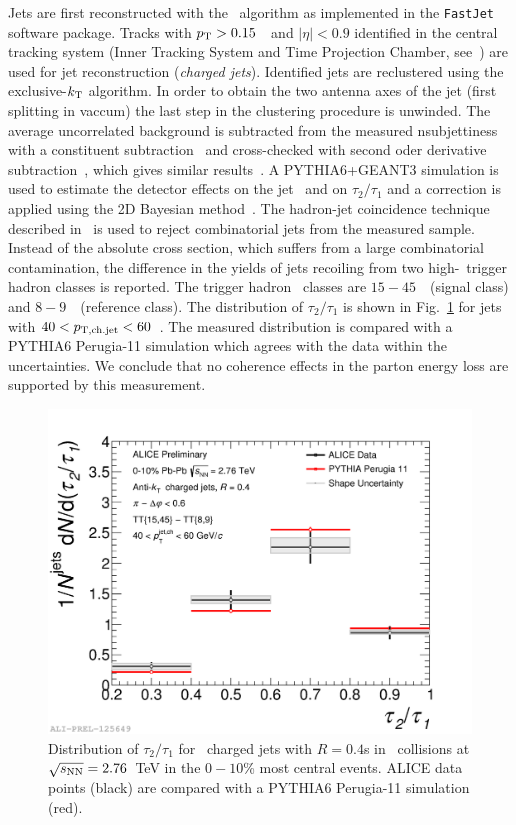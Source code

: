 \documentclass[10pt]{article}
\begin{document}
Jets are first reconstructed with the \antikt\ algorithm as implemented in the \texttt{FastJet}\cite{} software package.
Tracks with $p_{\rm T}>0.15$~\GeVc\ and $|\eta|<0.9$ identified in the central tracking system (Inner Tracking System and Time Projection Chamber, see~\cite{}) 
are used for jet reconstruction (\emph{charged jets}). 
Identified jets are reclustered using the exclusive-$k_{\rm T}$ algorithm. In order to obtain the two antenna axes of the jet (first splitting in vaccum) 
the last step in the clustering procedure is unwinded.
The average uncorrelated background is subtracted from the measured nsubjettiness with a constituent subtraction~\cite{} and cross-checked with second oder derivative subtraction~\cite{}, which gives similar results~\cite{}.
A PYTHIA6+GEANT3 simulation is used to estimate the detector effects on the jet \pt\ and on $\tau_2/\tau_1$ and a correction is applied using the 2D Bayesian method~\cite{}.
The hadron-jet coincidence technique described in~\cite{} is used to reject combinatorial jets from the measured sample. 
Instead of the absolute cross section, which suffers from a large combinatorial contamination, the difference in the yields of jets recoiling from two high-\pt\ trigger hadron classes is reported. 
The trigger hadron \pt\ classes are $15-45$~\GeVc\ (signal class) and $8-9$~\GeVc\ (reference class). The distribution of $\tau_2/\tau_1$ is shown in Fig.~\ref{fig:nsubjettiness} for jets with $40<p_{\rm T,ch.jet}<60$~\GeVc.
The measured distribution is compared with a PYTHIA6 Perugia-11 simulation which agrees with the data within the uncertainties. We conclude that no coherence effects in the parton energy loss are supported by this measurement.
\begin{figure}[tb]
\centering
\includegraphics[width=.5\textwidth]{img/2017-Feb-03-Tau2to1_40to60_Full_Results_0}
\caption{Distribution of $\tau_2/\tau_1$ for \antikt\ charged jets with $R=0.4$s in \PbPb\ collisions at $\sqrt{s_{\rm NN}}=2.76$~TeV in the $0-10$\% most central events. 
ALICE data points (black) are compared with a PYTHIA6 Perugia-11 simulation (red).}
\label{fig:nsubjettiness}
\end{figure}
\end{document}

